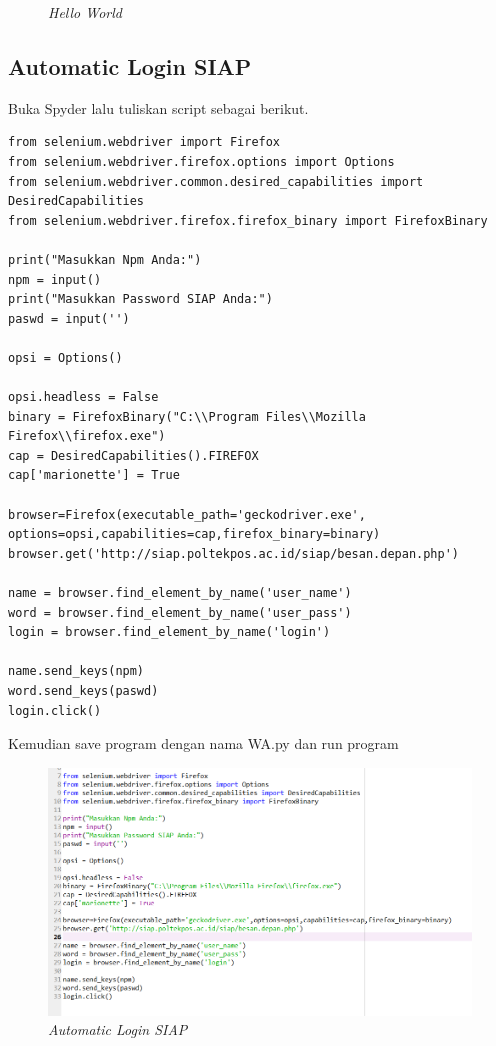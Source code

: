 \begin{enumerate}
\begin{figure}[H]
    \caption{\textit{Hello World}}
    \label{Hello World}
\end{figure}
\end{enumerate}

\subsection{Automatic Login SIAP}
Buka Spyder lalu tuliskan script sebagai berikut.
\begin{verbatim}
from selenium.webdriver import Firefox
from selenium.webdriver.firefox.options import Options
from selenium.webdriver.common.desired_capabilities import DesiredCapabilities
from selenium.webdriver.firefox.firefox_binary import FirefoxBinary

print("Masukkan Npm Anda:")
npm = input()
print("Masukkan Password SIAP Anda:")
paswd = input('')

opsi = Options()

opsi.headless = False
binary = FirefoxBinary("C:\\Program Files\\Mozilla Firefox\\firefox.exe")
cap = DesiredCapabilities().FIREFOX
cap['marionette'] = True

browser=Firefox(executable_path='geckodriver.exe',
options=opsi,capabilities=cap,firefox_binary=binary)
browser.get('http://siap.poltekpos.ac.id/siap/besan.depan.php')

name = browser.find_element_by_name('user_name')
word = browser.find_element_by_name('user_pass')
login = browser.find_element_by_name('login')

name.send_keys(npm)
word.send_keys(paswd)
login.click()
\end{verbatim}
Kemudian save program dengan nama WA.py dan run program
\begin{figure}[H]
    \centering
    \includegraphics[scale=0.5]{figures/login}
    \caption{\textit{Automatic Login SIAP}}
    \label{Automatic1}
\end{figure}
